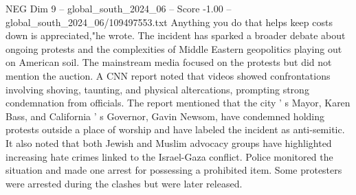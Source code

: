 \begin{textsample}{NEG Dim 9 – global\_south\_2024\_06 – Score -1.00 – global\_south\_2024\_06/109497553.txt}
Anything you do that helps keep costs down is appreciated,"he wrote.
The incident has sparked a broader debate about ongoing protests and the complexities of Middle Eastern geopolitics playing out on American soil.
The mainstream media focused on the protests but did not mention the auction.
A CNN report noted that videos showed confrontations involving shoving, taunting, and physical altercations, prompting strong condemnation from officials.
The report mentioned that the city ' s Mayor, Karen Bass, and California ' s Governor, Gavin Newsom, have condemned holding protests outside a place of worship and have labeled the incident as anti-semitic.
It also noted that both Jewish and Muslim advocacy groups have highlighted increasing hate crimes linked to the Israel-Gaza conflict.
Police monitored the situation and made one arrest for possessing a prohibited item.
Some protesters were arrested during the clashes but were later released.

\end{textsample}
